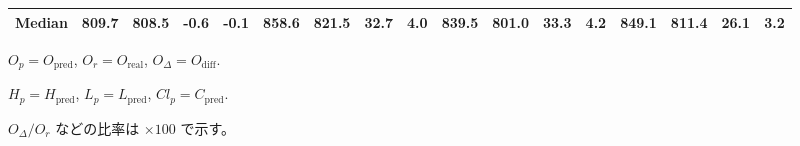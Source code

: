 \begin{threeparttable}
{\begin{tabular}{lrrrrrrrrrrrrrrrr}
 Median & 809.7 & 808.5 &       -0.6 &           -0.1 &  858.6 & 821.5 &       32.7 &            4.0 &  839.5 & 801.0 &       33.3 &            4.2 &  849.1 &  811.4 &        26.1 &              3.2 \\
\bottomrule
\end{tabular}
}
\begin{tablenotes}\footnotesize
\item $O_p=O_{\text{pred}}$, $O_r=O_{\text{real}}$, $O_\Delta=O_{\text{diff}}$.
\item $H_p=H_{\text{pred}}$, $L_p=L_{\text{pred}}$, $Cl_p=C_{\text{pred}}$.
\item $O_\Delta/O_r$ などの比率は \(\times100\) で示す。
\end{tablenotes}
\end{threeparttable}
\endgroup
